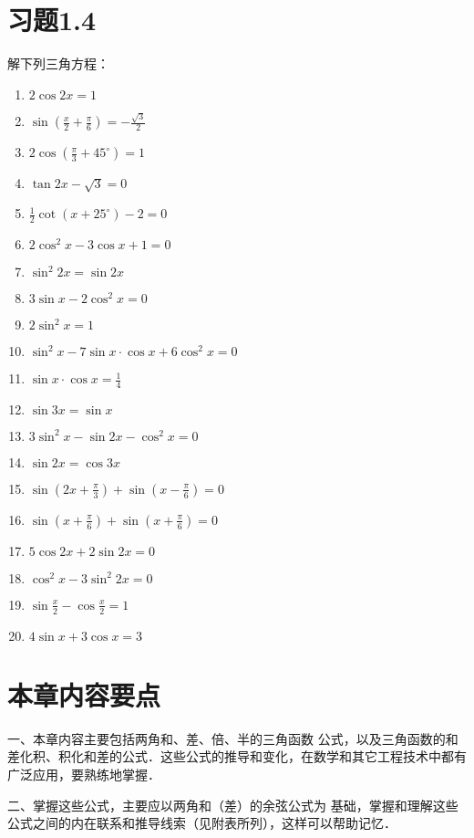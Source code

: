 \section*{习题1.4}
解下列三角方程：
\begin{multicols}{2}
    \begin{enumerate}
    \item $2\cos 2x=1$
    \item $\sin\left(\frac{x}{2}+\frac{\pi}{6}\right)=-\frac{\sqrt{3}}{2}$
    \item $2\cos\left(\frac{\pi}{3}+45^{\circ}\right)=1$
    \item $\tan2x-\sqrt{3}=0$
    \item $\frac{1}{2}\cot(x+25^{\circ})-2=0$
    \item $2\cos^2x-3\cos x+1=0$
    \item $\sin^2 2x=\sin 2x$
    \item $3\sin x-2\cos^2 x=0$
    \item $2\sin^2 x=1$
    \item $\sin^2 x-7\sin x\cdot \cos x+6\cos^2 x=0$
    \item $\sin x\cdot\cos x=\frac{1}{4}$
    \item $\sin 3x=\sin x$
    \item $3\sin^2 x-\sin 2x-\cos^2x=0$
    \item $\sin 2x=\cos 3x$
    \item $\sin\left(2x+\frac{\pi}{3}\right)+\sin\left(x-\frac{\pi}{6}\right)=0$
    \item $\sin\left(x+\frac{\pi}{6}\right)+\sin\left(x+\frac{\pi}{6}\right)=0$
    \item $5\cos2x+2\sin2x=0$
    \item $\cos^2x-3\sin^2 2x=0$
    \item $\sin\frac{x}{2}-\cos\frac{x}{2}=1$
    \item $4\sin x+3\cos x=3$
\end{enumerate}
\end{multicols}

\section*{本章内容要点}
一、本章内容主要包括两角和、差、倍、半的三角函数
公式，以及三角函数的和差化积、积化和差的公式．这些公式的推导和变化，在数学和其它工程技术中都有广泛应用，要熟练地掌握．

二、掌握这些公式，主要应以两角和（差）的余弦公式为
基础，掌握和理解这些公式之间的内在联系和推导线索（见附表所列），这样可以帮助记忆．

